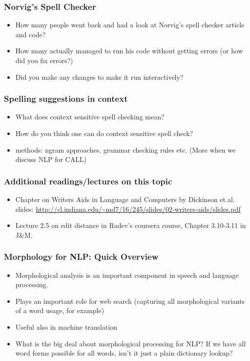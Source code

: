 \documentclass{beamer}
\begin{document}
\begin{frame}
\frametitle{Norvig's Spell Checker}
\begin{itemize}
\item How many people went back and had a look at Norvig's spell checker article and code? \pause
\item How many actually managed to run his code without getting errors (or how did you fix errors?) \pause
\item Did you make any changes to make it run interactively?
\end{itemize}
\end{frame}

\begin{frame}
\frametitle{Spelling suggestions in context}
\begin{itemize}
\item What does context sensitive spell checking mean? \pause
\item How do you think one can do context sensitive spell check? \pause
\item methods: ngram approaches, grammar checking rules etc. (More when we discuss NLP for CALL)
\end{itemize}
\end{frame}

\begin{frame}
\frametitle{Additional readings/lectures on this topic}
\begin{itemize}
\item Chapter on Writers Aids in Language and Computers by Dickinson et.al. 
\\ slides: \url{http://cl.indiana.edu/~md7/16/245/slides/02-writers-aids/slides.pdf}
\item Lecture 2.5 on edit distance in Radev's coursera course, Chapter 3.10-3.11 in J\&M. 
\end{itemize}
\end{frame}

\begin{frame}
\frametitle{Morphology for NLP: Quick Overview}
\begin{itemize}
\item Morphological analysis is an important component in speech and language processing. 
\item Plays an important role for web search (capturing all morphological variants of a word usage, for example)
\item Useful also in machine translation 
\item What is the big deal about morphological processing for NLP? If we have all word forms possible for all words, isn't it just a plain dictionary lookup?
\end{itemize}
\end{frame}
\end{document}
